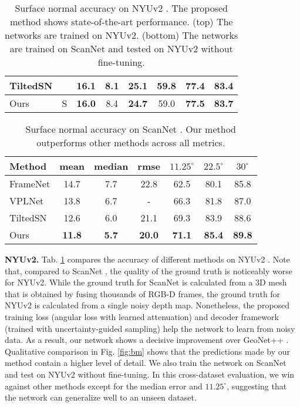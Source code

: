 \documentclass[10pt,twocolumn,letterpaper]{article}
\begin{document}
\begin{table}[t]
\begin{center}
\begin{tabular}{l|c|ccc|ccc}
TiltedSN\cite{SNfromRGB_20_TiltedSN} & & 16.1 & \textbf{8.1} & 25.1 & \textbf{59.8} & 77.4 & 83.4 \\
\hline
Ours & S & \textbf{16.0} & 8.4 & \textbf{24.7} & 59.0 & \textbf{77.5} & \textbf{83.7} \\
\bottomrule
\end{tabular}
\end{center}
\caption{Surface normal accuracy on NYUv2 \cite{NYUv2}. The proposed method shows state-of-the-art performance. (top) The networks are trained on NYUv2. (bottom) The networks are trained on ScanNet \cite{ScanNet} and tested on NYUv2 without fine-tuning.}
\label{table:BM-nyu}
\end{table}

\begin{table}[t]
\setlength\tabcolsep{1.5pt}
\begin{center}
\begin{tabular}{l|ccc|ccc}
\toprule
Method  & mean & median & rmse & $11.25^{\circ}$ & $22.5^{\circ}$ & $30^{\circ}$ \\
\midrule
FrameNet\cite{SNfromRGB_19_FrameNet} & 14.7 & 7.7 & 22.8 & 62.5 & 80.1 & 85.8 \\
VPLNet\cite{SNfromRGB_20_VPLNet} & 13.8 & 6.7 & - & 66.3 & 81.8 & 87.0 \\
TiltedSN\cite{SNfromRGB_20_TiltedSN} & 12.6 & 6.0 & 21.1 & 69.3 & 83.9 & 88.6 \\
\hline
Ours & \textbf{11.8} & \textbf{5.7} & \textbf{20.0} & \textbf{71.1} & \textbf{85.4} & \textbf{89.8} \\
\bottomrule
\end{tabular}
\end{center}
\caption{Surface normal accuracy on ScanNet \cite{ScanNet}. Our method outperforms other methods across all metrics.}
\label{table:BM-scannet}
\end{table}

\noindent
\textbf{NYUv2.} Tab. \ref{table:BM-nyu} compares the accuracy of different methods on NYUv2 \cite{NYUv2}. Note that, compared to ScanNet \cite{ScanNet}, the quality of the ground truth is noticeably worse for NYUv2. While the ground truth for ScanNet is calculated from a 3D mesh that is obtained by fusing thousands of RGB-D frames, the ground truth for NYUv2 is calculated from a single noisy depth map. Nonetheless, the proposed training loss (angular loss with learned attenuation) and decoder framework (trained with uncertainty-guided sampling) help the network to learn from noisy data. As a result, our network shows a decisive improvement over GeoNet++ \cite{SNfromRGB_20_GeoNet++}. Qualitative comparison in Fig. \ref{fig:bm} shows that the predictions made by our method contain a higher level of detail. We also train the network on ScanNet and test on NYUv2 without fine-tuning. In this cross-dataset evaluation, we win against other methods except for the median error and $11.25^{\circ}$, suggesting that the network can generalize well to an unseen dataset.
\end{document}
